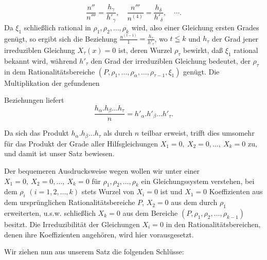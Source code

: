 \[
\frac{n''}{n'''}=\frac{h_\gamma}{h'_\gamma},\quad\frac{n'''}{n^{(4)}}=\frac{h_\delta}{h'_\delta},\quad\cdots.
\]
\noindent Da \(\xi_1\) schließlich rational in \(\rho_1,\rho_2,\ldots,\rho_k\) wird, also einer Gleichung ersten Grades genügt, so ergibt sich die Beziehung \(\frac{n^{(t-1)}}1=\frac{h_\tau}{h'_\tau}\), wo \(t\leqq k\) und \(h_\tau\) der Grad jener irreduziblen Gleichung \(X_\tau(x)=0\) ist, deren Wurzel \(\rho_\tau\) bewirkt, daß \(\xi_1\) rational bekannt wird, während \(h'_\tau\) den Grad der irreduziblen Gleichung bedeutet, der \(\rho_\tau\) in dem Rationalitätsbereiche \((P,\rho_1,\ldots,\rho_\alpha,\ldots,\rho_{\tau-1},\xi_1)\) genügt. Die Multiplikation der gefundenen
\par\endgroup

\clearpage{}
\par\begingroup\small
\noindent Beziehungen liefert
\[
\frac{h_\alpha\mathord{.}h_\beta\ldots h_\tau}{n}=h'_\alpha\mathord{.}h'_\beta\ldots h'_\tau.
\]
\par\noindent\hspace*{\parindent}Da sich das Produkt \(h_\alpha\mathord{.}h_\beta\ldots h_\tau\) als durch \(n\) teilbar erweist, trifft dies umsomehr für das Produkt der Grade aller Hilfsgleichungen \(X_1=0,\ X_2=0,\ldots,\ X_k=0\) zu, und damit ist unser Satz bewiesen.
\par\noindent\hspace*{\parindent}Der bequemeren Ausdrucksweise wegen wollen wir unter einer  \(X_1=0,\ X_2=0,\ldots,\ X_k=0\) für \(\rho_1,\rho_2,\ldots,\rho_k\) ein Gleichungssystem verstehen, bei dem \(\rho_i\) \((i=1,2,\ldots,k)\) stets Wurzel von \(X_i=0\) ist und \(X_1=0\) Koeffizienten aus dem ursprünglichen Rationalitätsbereiche \(P\), \(X_2=0\) aus dem durch \(\rho_1\) erweiterten, u.s.w. schließlich \(X_k=0\) aus dem Bereiche \((P,\rho_1,\rho_2,\ldots,\rho_{k-1})\) besitzt. Die Irreduzibilität der Gleichungen \(X_i=0\) in den Rationalitätsbereichen, denen ihre Koeffizienten angehören, wird hier  vorausgesetzt.
\par\noindent\hspace*{\parindent}Wir ziehen nun aus unserem Satz die folgenden Schlüsse:
